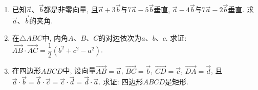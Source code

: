 \documentclass[10pt,a4paper]{article}
\begin{document}
\begin{enumerate}[1.]
\item 已知$\overrightarrow a$、$\overrightarrow b$都是非零向量, 且$\overrightarrow a+3\overrightarrow b$与$7\overrightarrow a-5\overrightarrow b$垂直, $\overrightarrow a-4\overrightarrow b$与$7\overrightarrow a-2\overrightarrow b$垂直. 求$\overrightarrow a$、$
\overrightarrow b$的夹角.
\item 在$\triangle ABC$中, 内角$A$、$B$、$C$的对边依次为$a$、$b$、$c$. 求证: $\overrightarrow{AB}\cdot \overrightarrow{AC}=\dfrac 12(b^2+c^2-a^2)$.
\item 在四边形$ABCD$中, 设向量$\overrightarrow{AB}=\overrightarrow a$, $\overrightarrow{BC}=\overrightarrow b$, $\overrightarrow{CD}=\overrightarrow c$, $\overrightarrow{DA}=\overrightarrow d$, 且$\overrightarrow a\cdot \overrightarrow b=\overrightarrow b\cdot
\overrightarrow c=\overrightarrow c\cdot \overrightarrow d=\overrightarrow d\cdot \overrightarrow a$. 求证: 四边形$ABCD$是矩形.



\iffalse


\end{enumerate}
\end{document}

